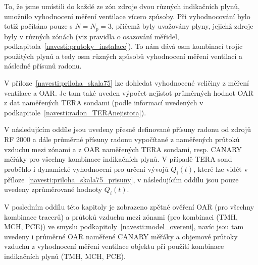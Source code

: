 To, že jsme umístili do každé ze zón zdroje dvou různých indikačních plynů, umožnilo vyhodnocení měření ventilace vícero způsoby. Při vyhodnocování bylo totiž počítáno pouze s $N=N_p=3$, přičemž byly uvažovány plyny, jejichž zdroje byly v různých zónách (viz pravidla o osazování měřidel, podkapitola~\ref{navesti:prutoky_instalace}). To nám dává osm kombinací trojic použitých plynů a tedy osm různých způsobů vyhodnocení měření ventilaci a následně přísunů radonu.

V příloze~\ref{navesti:priloha_skala75} lze dohledat vyhodnocené veličiny z měření ventilace a OAR. Je tam také uveden výpočet nejistot průměrných hodnot OAR z dat naměřených TERA sondami (podle informací uvedených v podkapitole~\ref{navesti:radon_TERAnejistota}). 

V následujícím oddíle jsou uvedeny přesně definované přísuny radonu od zdrojů RF 2000 a dále průměrné přísuny radonu vypočítané z naměřených průtoků vzduchu mezi zónami a z OAR naměřených TERA sondami, resp. CANARY měřáky pro všechny kombinace indikačních plynů. V případě TERA sond proběhlo i dynamické vyhodnocení pro určení vývojů $Q_i(t)$, které lze vidět v příloze~\ref{navesti:priloha_skala75_prisuny}, v následujícím oddílu jsou pouze uvedeny zprůměrované hodnoty $Q_i(t)$.

V posledním oddílu této kapitoly je zobrazeno zpětné ověření OAR (pro všechny kombinace tracerů) a průtoků vzduchu mezi zónami (pro kombinaci (TMH, MCH, PCE)) ve smyslu podkapitoly~\ref{navesti:model_overeni}, navíc jsou tam uvedeny i průměrné OAR naměřené CANARY měřáky a objemové průtoky vzduchu z vyhodnocení měření ventilace objektu při použití kombinace indikačních plynů (TMH, MCH,
PCE).



